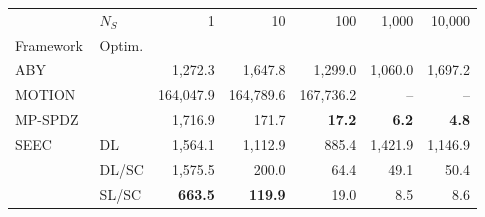 \begin{tabular}{llrrrrr}
\toprule
 & $N_S$ & 1 & 10 & 100 & 1,000 & 10,000 \\
Framework & Optim. &  &  &  &  &  \\
\midrule
ABY~\cite{DSZ15} &  & 1,272.3 & 1,647.8 & 1,299.0 & 1,060.0 & 1,697.2 \\
\cline{1-7}
MOTION~\cite{BDST22} &  & 164,047.9 & 164,789.6 & 167,736.2 & -- & -- \\
\cline{1-7}
MP-SPDZ~\cite{CCS:Keller20} &  & 1,716.9 & 171.7 & \bfseries 17.2 & \bfseries 6.2 & \bfseries 4.8 \\
\cline{1-7}
\multirow[c]{3}{*}{SEEC} & DL & 1,564.1 & 1,112.9 & 885.4 & 1,421.9 & 1,146.9 \\
 & DL/SC & 1,575.5 & 200.0 & 64.4 & 49.1 & 50.4 \\
 & SL/SC & \bfseries 663.5 & \bfseries 119.9 & 19.0 & 8.5 & 8.6 \\
\bottomrule
\end{tabular}

